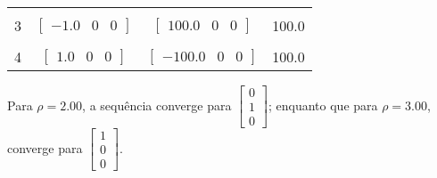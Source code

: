 \documentclass[a4paper,11pt]{article}
\begin{document}
\begin{enumerate}[label=\textbf{(\alph*)}]
\begin{center}
\begin{tabular}{ | c | c | c | c | }
                    \hline
                    & & & \\ [-1em]
                    3  & $\begin{bmatrix} -1.0 & 0 & 0 \end{bmatrix}$ & $\begin{bmatrix} 100.0 & 0 & 0 \end{bmatrix}$  & 100.0 \\ [+.5em]
                    \hline
                    & & & \\ [-1em]
                    4  & $\begin{bmatrix} 1.0 & 0 & 0 \end{bmatrix}$ & $\begin{bmatrix} -100.0 & 0 & 0 \end{bmatrix}$  & 100.0 \\ [+.5em]
                    \hline
                \end{tabular}
            \end{center}
            Para $\rho = 2.00$, a sequência converge para $\begin{bmatrix} 0 \\ 1 \\ 0\end{bmatrix}$; enquanto que para $\rho = 3.00$, converge para $\begin{bmatrix} 1 \\ 0 \\ 0\end{bmatrix}$.
            
        \end{enumerate}
    
\end{document}
